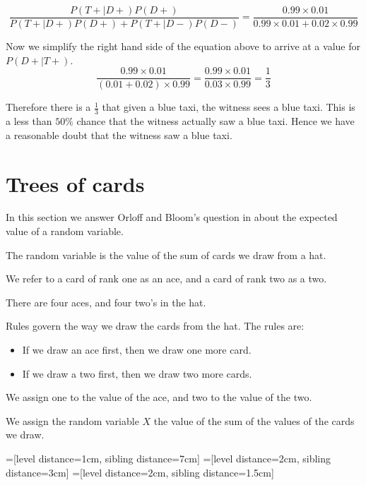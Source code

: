 \documentclass[a4paper,11pt]{article}
\begin{document}
\begin{equation}
\frac{ P \left( T+ \mid D+ \right) P \left( D+ \right) }
    { P \left( T+ \mid D+ \right) P \left( D+ \right) 
      + P \left( T+ \mid D- \right) P \left(D- \right)}
  = \frac{ 0.99 \times 0.01 }
  { 0.99 \times 0.01 + 0.02 \times 0.99 }
\end{equation}

Now we simplify the right hand side of the equation above to arrive at
a value for $P \left( D+ \mid T+ \right)$.
\begin{equation}
 \frac{ 0.99 \times 0.01 }
  {  \left(0.01 + 0.02 \right) \times 0.99 }
  = \frac{ 0.99 \times 0.01 }
  {  0.03 \times 0.99 }
  = \frac{1}{3}
\end{equation}

Therefore there is a $\frac{1}{3}$ that given a blue taxi, the witness
sees a blue taxi.  This is a less than $50\%$ chance that the witness
actually saw a blue taxi. Hence we have a reasonable doubt that the 
witness saw a blue taxi.

\section{Trees of cards}
\label{treesOfCards}
In this section we answer Orloff and Bloom's question in \cite{probSet2}
about the expected value of a random variable.

The random variable is the value of the sum of cards we draw from a 
hat.  

We refer to a card of rank one as an ace, and a card of rank two as
a two.

There are four aces, and four two's in the hat.

Rules govern the way we draw the cards from the hat.  The rules are: 
\begin{itemize}
\item If we draw an ace first, then we draw one more card. 
\item If we draw a two first, then we draw two more cards.
\end{itemize}

We assign one to the value of the ace, and two to the value of the two.

We assign the random variable $X$ the value of the sum of the values
of the cards we draw.

=[level distance=1cm, sibling distance=7cm]
=[level distance=2cm, sibling distance=3cm]
=[level distance=2cm, sibling distance=1.5cm]
\end{document}
